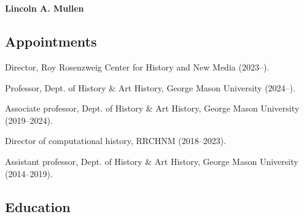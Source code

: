 \documentclass[11pt]{article}
\begin{document}
\thispagestyle{fancy}
\fancyfoot{}
\fancyhead{}
\renewcommand{\headrulewidth}{0pt}

\hfill\hfill\hfill
\hfill\hfill\hfill
\hfill\hfill\hfill
\hfill\hfill\hfill
\begin{minipage}[t]{2.2in}
   \\
   \\
\end{minipage}
\hfill
\begin{minipage}[t]{3.0in}
\end{minipage}

\vspace{0.4in}

{\Large\sffamily\bfseries Lincoln A. Mullen}\\[-0.1in]

\subsection{Appointments}\label{Appointments}

Director, Roy Rosenzweig Center for History and New Media (2023--).

Professor, Dept. of History \& Art History, George Mason University 
(2024--).

Associate professor, Dept. of History \& Art History, George Mason University 
(2019--2024).

Director of computational history, RRCHNM (2018--2023).

Assistant professor, Dept. of History \& Art History, George Mason University (2014--2019).

\subsection{Education}\label{Education}
\end{document}
